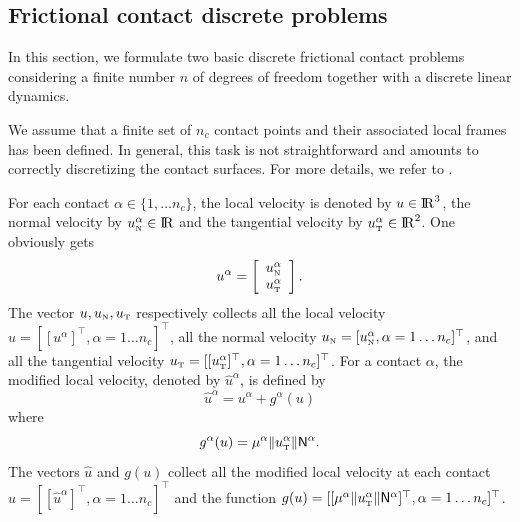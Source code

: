 


\subsection{Frictional contact discrete problems}

In this section, we formulate two basic discrete frictional contact problems considering a finite number $n$ of degrees of freedom  together with a discrete linear dynamics.

 We assume that a finite set of $n_c$ contact points and their associated local frames has been defined. In general, this task is not straightforward and amounts to correctly discretizing  the contact surfaces. For more details, we refer to \cite{Wriggers2006,Laursen2003}.

For each contact $\alpha \in \{1,\ldots n_c\}$, the  local velocity  is denoted by $u \in \mathrm{I\!R}^3$, the normal velocity by $u_{\hbox{\tiny{N}}}^{\alpha}\in \mathrm{I\!R}$ and the tangential velocity by $u_{\hbox{\tiny{T}}}^\alpha\in\mathrm{I\!R}^2$. One obviously 
gets
\begin{equation}
  \label{eq:contactvelocity}
  u^\alpha =\left[
  \begin{array}{c}
    u^\alpha_{\n} \\
    u^\alpha_{\t}   
  \end{array}\right].
\end{equation}
The vector $u, u_{\hbox{\tiny{N}}}, u_{\hbox{\tiny{T}}}$ respectively collects all the local velocity
$  u = [[u^\alpha]^\top, \alpha = 1\ldots n_c]^\top$,
all the normal velocity 
$
  u_{\hbox{\tiny{N}}} = [ u^\alpha_{{\hbox{\tiny{N}}}}, \alpha = 1\ldots n_c]^\top$,
and all the  tangential velocity
$
  u_{\hbox{\tiny{T}}} = [ [u^\alpha_{{\hbox{\tiny{T}}}}]^\top, \alpha = 1\ldots n_c]^\top$.
For a contact $\alpha $, the modified local velocity, denoted by $\hat u^\alpha $, is defined by
\begin{equation}
  \label{eq:modified}
  \hat u^\alpha = u^\alpha + g^\alpha(u)
\end{equation}
where
\begin{equation}
  \label{eq:modified-bis}
  g^\alpha(u) =  \mu^\alpha  \|u^\alpha_\t\| {\sf N}^\alpha.
\end{equation}
The vectors $\hat u$ and $g(u)$ collect all the modified local velocity at each contact $\hat u = [[\hat u^\alpha]^\top, \alpha = 1\ldots n_c]^\top$ and the function $g(u) = [[\mu^\alpha  \|u^\alpha_{\hbox{\tiny{T}}}\| {\sf N}^\alpha]^\top, \alpha = 1\ldots n_c]^\top$.

